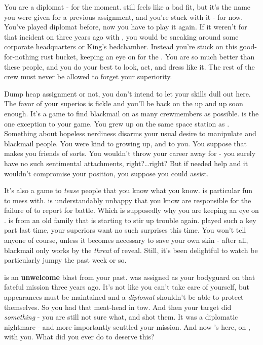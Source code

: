 \documentclass[char]{TMFHope}
\begin{document}
\name{\cDip{}}

You are a diplomat - for the moment. \cDip{} still feels like a bad fit, but it's the name you were given for a previous assignment, and you're stuck with it - for now. You've played diplomat before, now you have to play it again. If it weren't for that incident on \pHome{} three years ago with \cWeap{}, you would be sneaking around some corporate headquarters or King's bedchamber. Instead you're stuck on this good-for-nothing rust bucket, keeping an eye on \cXO{} for the \pPlan{}. You are so much better than these people, and you do your best to look, act, and dress like it. The rest of the crew must never be allowed to forget your superiority.

Dump heap assignment or not, you don't intend to let your skills dull out here. The favor of your superios is fickle and you'll be back on the up and up soon enough. It's a game to find blackmail on as many crewmembers as possible. \cMed{} is the one exception to your game. You grew up on the same space station as \cMed{\them}. Something about  hopeless nerdiness disarms your usual desire to manipulate and blackmail people. You were kind to \cMed{\them} growing up, and \cMed{\they} to you. You suppose that makes you friends of sorts. You wouldn't throw your career away for \cMed{\them} - you surely have no such sentimental attachments, right?\ldots right? But if \cMed{} needed help and it wouldn't compromise your position, you suppose you could assist.

It's also a game to \emph{tease} people that you know what you know. \cXO{} is particular fun to mess with. \cXO{\They} is understandably unhappy that you know \cXO{\they} are responsible for the failure of \pOld{} to report for battle. Which is supposedly why you are keeping an eye on \cXO{\them}. \cXO{} is from an old \pEdge{} family that is starting to stir up trouble again. \cXO{\They} played such a key part last time, your superiors want no such surprises this time. You won't tell anyone of course, unless it becomes necessary to save your own skin - after all, blackmail only works by the \emph{threat} of reveal. Still, it's been delightful to watch \cXO{} be particularly jumpy the past week or so. 

\cWeap{} is an {\bf unwelcome} blast from your past. \cWeap{} was assigned as your bodyguard on that fateful mission three years ago. It's not like you can't take care of yourself, but appearances must be maintained and a \emph{diplomat} shouldn't be able to protect themselves. So you had that meat-head in tow. And then your target did \emph{something} - you are still not sure what, and \cWeap{} shot them. It was a diplomatic nightmare - and more importantly scuttled your mission. And now \cWeap{\they}'s here, on \pNew{}, with you. What did you ever do to deserve this?
\end{document}
